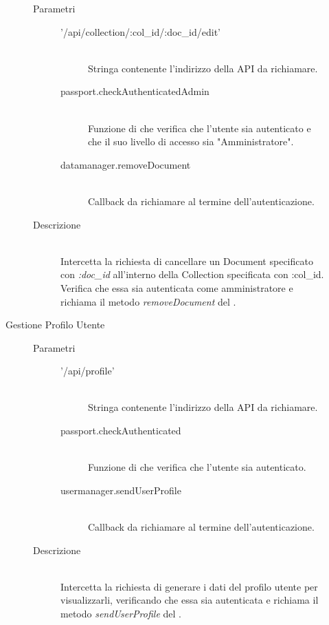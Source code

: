 \begin{description}
\begin{description}
\begin{mldescription}
   \hfill 
  \begin{description}
   \item[Parametri] \hfill 
    \begin{description}
     \item['/api/collection/:col\_id/:doc\_id/edit'] \hfill \\
     Stringa contenente l'indirizzo della API da richiamare.
     \item[passport.checkAuthenticatedAdmin] \hfill \\
     Funzione di  che verifica che l'utente sia autenticato e che il suo livello di accesso sia "Amministratore".
     \item[datamanager.removeDocument] \hfill \\
     Callback da richiamare al termine dell'autenticazione.
     \end{description}
   \item[Descrizione] \hfill \\ 
  Intercetta la richiesta di cancellare un Document specificato con \textit{:doc\_id} all'interno della Collection specificata con :col\_id. Verifica che essa sia autenticata come amministratore e richiama il metodo \textit{removeDocument} del .
  \end{description}
 
 \end{mldescription}
 
 \item[Gestione Profilo Utente]
 \begin{mldescription}
   \hfill 
   \begin{description}
    \item[Parametri] \hfill
     \begin{description}
      \item['/api/profile'] \hfill \\
      Stringa contenente l'indirizzo della API da richiamare.
      \item[passport.checkAuthenticated] \hfill \\
      Funzione di  che verifica che l'utente sia autenticato.
      \item[usermanager.sendUserProfile] \hfill \\
      Callback da richiamare al termine dell'autenticazione.
     \end{description}
    \item[Descrizione] \hfill \\
    Intercetta la richiesta di generare i dati del profilo utente per visualizzarli, verificando che essa sia autenticata e richiama il metodo \textit{sendUserProfile} del .
    \end{description}
    

\end{mldescription}
\end{description}
\end{description}

